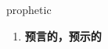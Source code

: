 
\begin{frame}
{\huge prophetic}
\begin{center}
\begin{enumerate}\Large
  \item \textbf{预言的，预示的}
\end{enumerate}
\end{center}
\end{frame}

